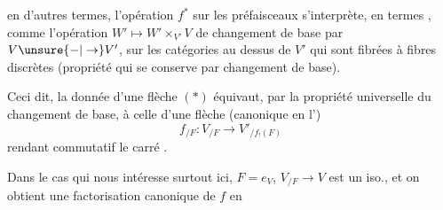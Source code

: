 
en d'autres termes, l'opération $f^*$ sur les préfaisceaux s'interprète, en termes , comme
l'opération $W'\mapsto W'\times_{V'}V$ de changement
de base par $V\unsure{-|\to}V'$, sur les catégories au
dessus de $V'$ qui sont fibrées à fibres discrètes (propriété qui se conserve par changement de base).

Ceci dit, la donnée d'une flèche
$(*)$ équivaut, par la propriété universelle
du changement de base, à celle d'une
flèche (canonique en l')
\[
 f_{/F}:V_{/F}\longrightarrow V'_{/f_!(F)}
\]
rendant commutatif le carré
.

Dans le cas qui nous intéresse surtout ici,
$F=e_V$, $V_{/F}\to V$ est un iso., et on
obtient une factorisation canonique de $f$ en

